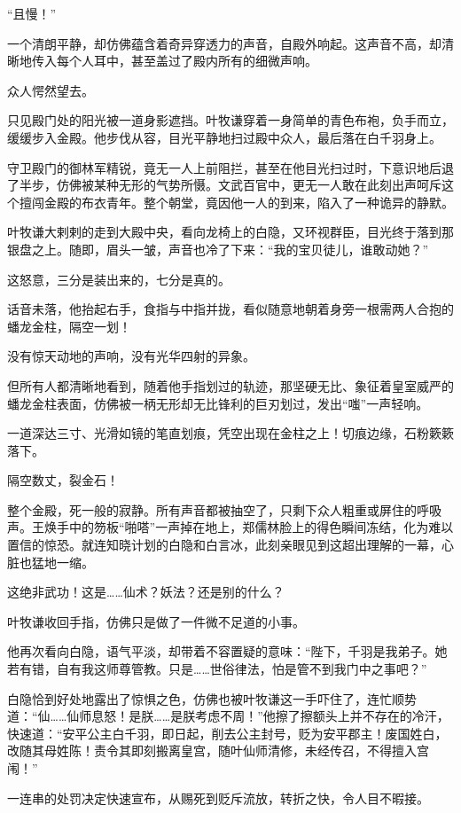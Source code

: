“且慢！”

一个清朗平静，却仿佛蕴含着奇异穿透力的声音，自殿外响起。这声音不高，却清晰地传入每个人耳中，甚至盖过了殿内所有的细微声响。

众人愕然望去。

只见殿门处的阳光被一道身影遮挡。叶牧谦穿着一身简单的青色布袍，负手而立，缓缓步入金殿。他步伐从容，目光平静地扫过殿中众人，最后落在白千羽身上。

守卫殿门的御林军精锐，竟无一人上前阻拦，甚至在他目光扫过时，下意识地后退了半步，仿佛被某种无形的气势所慑。文武百官中，更无一人敢在此刻出声呵斥这个擅闯金殿的布衣青年。整个朝堂，竟因他一人的到来，陷入了一种诡异的静默。

叶牧谦大剌剌的走到大殿中央，看向龙椅上的白隐，又环视群臣，目光终于落到那银盘之上。随即，眉头一皱，声音也冷了下来：“我的宝贝徒儿，谁敢动她？”

这怒意，三分是装出来的，七分是真的。

话音未落，他抬起右手，食指与中指并拢，看似随意地朝着身旁一根需两人合抱的蟠龙金柱，隔空一划！

没有惊天动地的声响，没有光华四射的异象。

但所有人都清晰地看到，随着他手指划过的轨迹，那坚硬无比、象征着皇室威严的蟠龙金柱表面，仿佛被一柄无形却无比锋利的巨刃划过，发出“嗤”一声轻响。

一道深达三寸、光滑如镜的笔直划痕，凭空出现在金柱之上！切痕边缘，石粉簌簌落下。

隔空数丈，裂金石！

整个金殿，死一般的寂静。所有声音都被抽空了，只剩下众人粗重或屏住的呼吸声。王焕手中的笏板“啪嗒”一声掉在地上，郑儒林脸上的得色瞬间冻结，化为难以置信的惊恐。就连知晓计划的白隐和白言冰，此刻亲眼见到这超出理解的一幕，心脏也猛地一缩。

这绝非武功！这是……仙术？妖法？还是别的什么？

叶牧谦收回手指，仿佛只是做了一件微不足道的小事。

他再次看向白隐，语气平淡，却带着不容置疑的意味：“陛下，千羽是我弟子。她若有错，自有我这师尊管教。只是……世俗律法，怕是管不到我门中之事吧？”

白隐恰到好处地露出了惊惧之色，仿佛也被叶牧谦这一手吓住了，连忙顺势道：“仙……仙师息怒！是朕……是朕考虑不周！”他擦了擦额头上并不存在的冷汗，快速道：“安平公主白千羽，即日起，削去公主封号，贬为安平郡主！废国姓白，改随其母姓陈！责令其即刻搬离皇宫，随叶仙师清修，未经传召，不得擅入宫闱！”

一连串的处罚决定快速宣布，从赐死到贬斥流放，转折之快，令人目不暇接。


